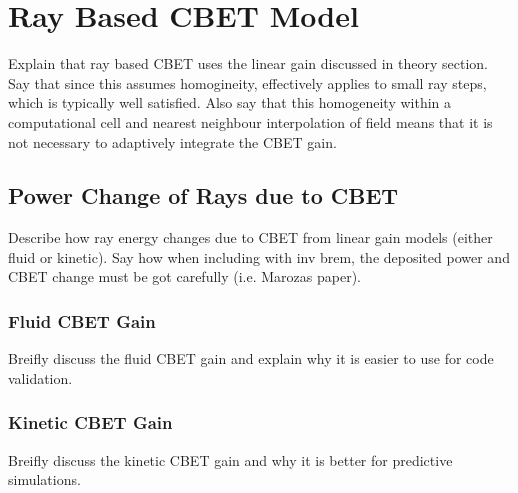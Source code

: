 \section{Ray Based CBET Model}

Explain that ray based CBET uses the linear gain discussed in theory section.
Say that since this assumes homogineity, effectively applies to small ray steps, which is typically well satisfied.
Also say that this homogeneity within a computational cell and nearest neighbour interpolation of field means that it is not necessary to adaptively integrate the CBET gain.

\subsection{Power Change of Rays due to CBET}

Describe how ray energy changes due to CBET from linear gain models (either fluid or kinetic).
Say how when including with inv brem, the deposited power and CBET change must be got carefully (i.e. Marozas paper).

\subsubsection{Fluid CBET Gain}

Breifly discuss the fluid CBET gain and explain why it is easier to use for code validation.

\subsubsection{Kinetic CBET Gain}

Breifly discuss the kinetic CBET gain and why it is better for predictive simulations.

